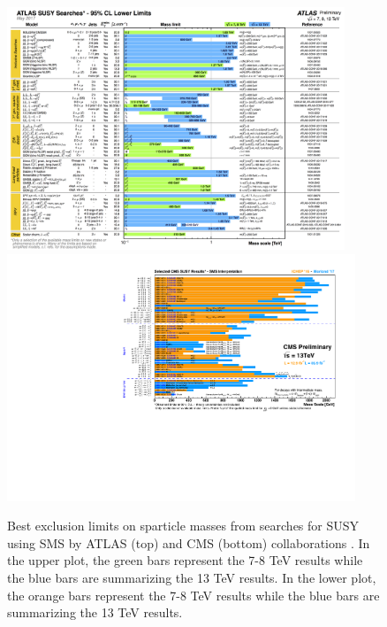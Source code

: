 \begin{figure}[!hb]
\centering
  \includegraphics[width=0.9\textwidth]{Plots/SUSY/ATLAS_SUSY_Summary}
  \includegraphics[width=0.93\textwidth]{Plots/SUSY/CMS_Moriond2017_BarPlot}
  \caption{ Best exclusion limits on sparticle masses from searches for SUSY using SMS by ATLAS (top) and CMS (bottom) collaborations \cite{atlasSUSYsummary,cmsSUSYsummary}. In the upper plot, the green bars represent the 7-8 TeV results while the blue bars are summarizing the 13 TeV results. In the lower plot, the orange bars represent the 7-8 TeV results while the blue bars are summarizing the 13 TeV results.
  }
  \label{fig:susy_Summary}
\end{figure}

